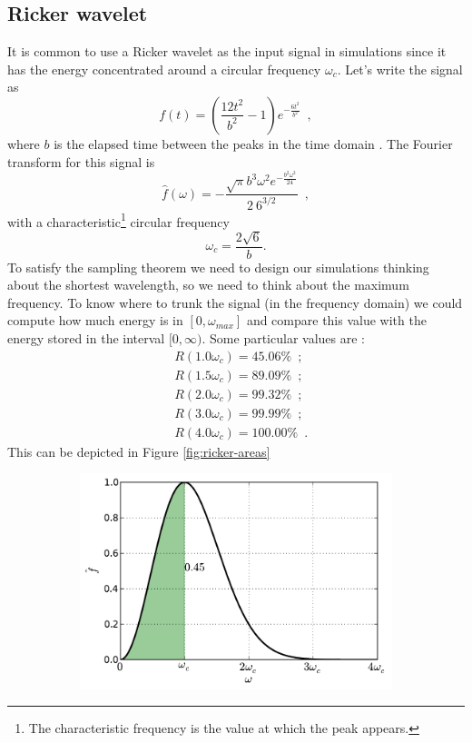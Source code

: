 \documentclass[12pt,letterpaper]{article}
\begin{document}
{\subsection{Ricker wavelet}
It is common to use a Ricker wavelet as the input signal in simulations since it has the energy concentrated around a circular frequency $\omega_{c}$. Let's write the signal as 
\[f(t)=\left(\frac{12t^{2}}{b^{2}}-1\right)e^{-\frac{6t^{2}}{b^{2}}}\enspace,\]
 where $b$ is the elapsed time between the peaks in the time domain \cite{Papageorgiou91}. The Fourier transform for this signal is  
\[\hat{f}(\omega)=-\frac{\sqrt{\pi}b^{3}\omega^{2}e^{-\frac{b^{2}\omega^{2}}{24}}}{2\ 6^{3/2}}\enspace, \]
with a characteristic\footnote{The characteristic frequency is the value at which the peak appears.} circular frequency 
\[\omega_{c}=\frac{2\sqrt{6}}{b}. \]
To satisfy the sampling theorem we need to design our simulations
thinking about the shortest wavelength, so we need to think about
the maximum frequency. To know where to trunk the signal (in the frequency domain) we could compute how much energy is in $[0,\omega_{max}]$ and compare this value with the energy stored in the interval $[0,\infty)$. Some particular values are : 
\begin{align*}
 & R(1.0\omega_{c})=45.06\%\enspace;\\
 & R(1.5\omega_{c})=89.09\%\enspace;\\
 & R(2.0\omega_{c})=99.32\%\enspace;\\
 & R(3.0\omega_{c})=99.99\%\enspace;\\
 & R(4.0\omega_{c})=100.00\%\enspace.
\end{align*}
This can be depicted in Figure \ref{fig:ricker-areas}
\begin{figure}[H]
    \centering
    \begin{subfigure}[b]{0.45\textwidth}
        \includegraphics[width=\textwidth]{img/ricker_area=1.pdf}

\end{subfigure}
\end{figure}}
\end{document}
